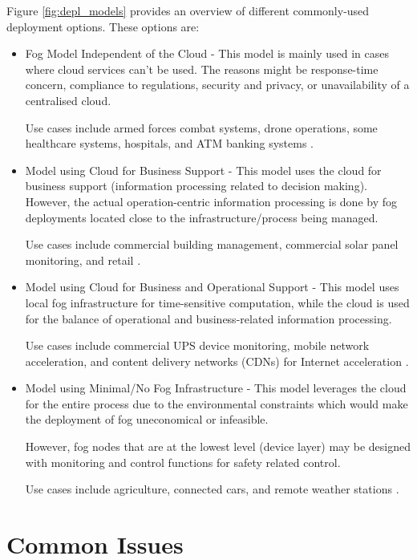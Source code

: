 \documentclass{article}
\begin{document}
Figure \ref{fig:depl_models} provides an overview of different commonly-used deployment options. These options are:

\begin{itemize}
	\item Fog Model Independent of the Cloud - This model is mainly used in cases where cloud services can't be used. The reasons might be response-time concern, compliance to regulations, security and privacy, or unavailability of a centralised cloud.
	
	Use cases include armed forces combat systems, drone operations, some healthcare systems, hospitals, and ATM banking systems \cite{openfogconsortium2017}.

	\item Model using Cloud for Business Support - This model uses the cloud for business support (information processing related to decision making).  However, the actual operation-centric information processing is done by fog deployments located close to the infrastructure/process being managed.

	Use cases include commercial building management, commercial solar panel monitoring, and retail \cite{openfogconsortium2017}.

	\item Model using Cloud for Business and Operational Support - This model uses local fog infrastructure for time-sensitive computation, while the cloud is used for the balance of operational and business-related information processing.

	Use cases include commercial UPS device monitoring, mobile network acceleration, and content delivery networks (CDNs) for Internet acceleration \cite{openfogconsortium2017}.

	\item Model using Minimal/No Fog Infrastructure - This model leverages the cloud for the entire process due to the environmental constraints which would make the deployment of fog uneconomical or infeasible.

	However, fog nodes that are at the lowest level (device layer) may be designed with monitoring and control functions for safety related control.

	Use cases include agriculture, connected cars, and remote weather stations \cite{openfogconsortium2017}.
\end{itemize}


\pagebreak

\section{Common Issues}
\end{document}
